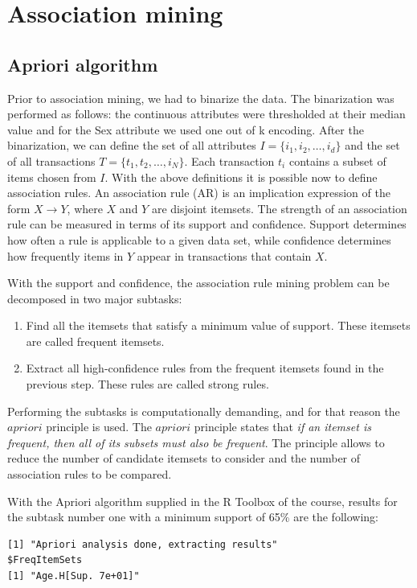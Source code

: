 \documentclass[10pt, paper=a4]{article}
\begin{document}
\newpage
\section{Association mining}
\label{sec:association}
\subsection{Apriori algorithm}
Prior to association mining, we had to binarize the data.  The binarization was
performed as follows: the continuous attributes were thresholded at their median
value and for the Sex attribute we used one out of k encoding.  After the
binarization, we can define the set of all attributes $I = \{i_1, i_2,\dots
,i_d\}$ and the set of all transactions $T = \{t_1, t_2, \dots ,i_N\}$.  Each
transaction $t_i$ contains a subset of items chosen from $I$.  With the above
definitions it is possible now to define association rules.  An association rule
(AR) is an implication expression of the form $X \rightarrow Y$, where $X$ and
$Y$ are disjoint itemsets.  The strength of an association rule can be measured
in terms of its support and confidence.  Support determines how often a rule is
applicable to a given data set, while confidence determines how frequently items
in $Y$ appear in transactions that contain $X$.

With the support and confidence, the association rule mining problem can be
decomposed in two major subtasks:
\begin{enumerate}
\item Find all the itemsets that satisfy a minimum value of support. These
  itemsets are called frequent itemsets.
\item Extract all high-confidence rules from the frequent itemsets found in the
  previous step. These rules are called strong rules.
\end{enumerate}

Performing the subtasks is computationally demanding, and for that reason the
$apriori$ principle is used.  The $apriori$ principle states that \textit{if an
  itemset is frequent, then all of its subsets must also be frequent}.  The
principle allows to reduce the number of candidate itemsets to consider and the
number of association rules to be compared.

With the Apriori algorithm supplied in the R Toolbox of the course, results for
the subtask number one with a minimum support of 65\% are the following:
\begin{verbatim}
[1] "Apriori analysis done, extracting results"
$FreqItemSets
[1] "Age.H[Sup. 7e+01]"
\end{verbatim}
\end{document}
